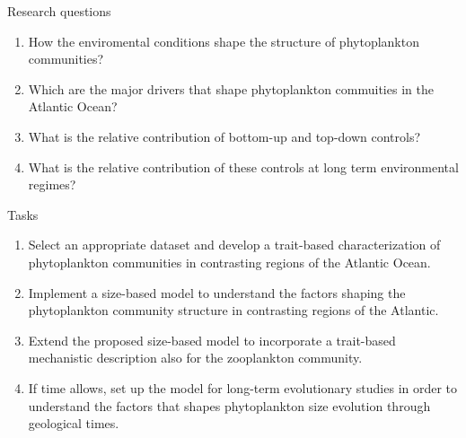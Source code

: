 \documentclass{beamer}
\begin{document}
\begin{frame}{Research questions}

\begin{enumerate}
 \item {How the enviromental conditions shape the structure of phytoplankton communities?}

\vspace{0.5cm}

\pause

\item {Which are the major drivers that shape phytoplankton commuities in the Atlantic Ocean? }

\vspace{0.5cm}

\pause

\item {What is the relative contribution of bottom-up and top-down controls?}

\vspace{0.5cm}

\pause

\item {What is the relative contribution of these controls at long term environmental regimes?}

\end{enumerate}

\end{frame}
\begin{frame}{Tasks}

\begin{enumerate}
\item Select an appropriate dataset and develop a trait-based characterization of phytoplankton communities in contrasting regions of the Atlantic Ocean.
\pause 
\item Implement a size-based model to understand the factors shaping the phytoplankton community structure in contrasting regions of the Atlantic.
\pause
\item Extend the proposed size-based model to incorporate a trait-based mechanistic description also for the zooplankton community.
\pause
\item If time allows, set up the model for long-term evolutionary studies in order to understand the factors that shapes phytoplankton size evolution through geological times.
\end{enumerate}

\end{frame}
\end{document}
